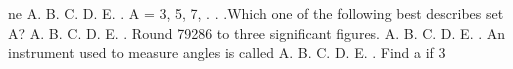 \documentclass{article}
\begin{document}
\begin{multicols}{2}
ne \indent A. \newline \indent B. \newline \indent C. \newline \indent D. \newline \indent E.  \newline{}. A = {3, 5, 7, . . .}Which one of the following best describes set A? \newline \indent A. \newline \indent B. \newline \indent C. \newline \indent D. \newline \indent E.  \newline{}. Round 79286 to three significant figures. \newline \indent A. \newline \indent B. \newline \indent C. \newline \indent D. \newline \indent E.  \newline{}. An instrument used to measure angles is called \newline \indent A. \newline \indent B. \newline \indent C. \newline \indent D. \newline \indent E.  \newline{}. Find a if 3
\end{multicols}
\end{document}
